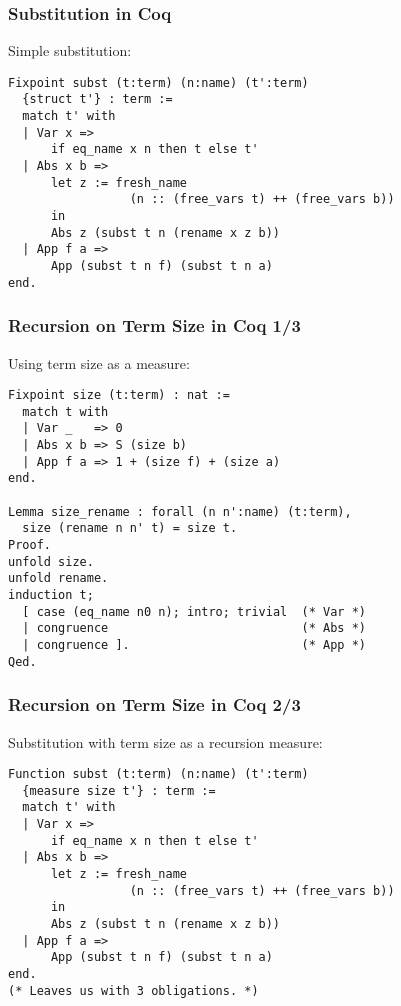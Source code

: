 \documentclass[notheorems]{beamer}
\begin{document}
\begin{frame}[fragile]

  \frametitle{Substitution in Coq}

  Simple substitution:
  \begin{lstlisting}
Fixpoint subst (t:term) (n:name) (t':term)
  {struct t'} : term :=
  match t' with
  | Var x =>
      if eq_name x n then t else t'
  | Abs x b =>
      let z := fresh_name
                 (n :: (free_vars t) ++ (free_vars b))
      in
      Abs z (subst t n (rename x z b))
  | App f a =>
      App (subst t n f) (subst t n a)
end.
  \end{lstlisting}

\end{frame}


\begin{frame}[fragile]

  \frametitle{Recursion on Term Size in Coq 1/3}

  Using term size as a measure:
  \begin{lstlisting}
Fixpoint size (t:term) : nat :=
  match t with
  | Var _   => 0
  | Abs x b => S (size b)
  | App f a => 1 + (size f) + (size a)
end.

Lemma size_rename : forall (n n':name) (t:term),
  size (rename n n' t) = size t.
Proof.
unfold size.
unfold rename.
induction t;
  [ case (eq_name n0 n); intro; trivial  (* Var *)
  | congruence                           (* Abs *)
  | congruence ].                        (* App *)
Qed.
  \end{lstlisting}

\end{frame}


\begin{frame}[fragile]

  \frametitle{Recursion on Term Size in Coq 2/3}

  Substitution with term size as a recursion measure:
  \begin{lstlisting}
Function subst (t:term) (n:name) (t':term)
  {measure size t'} : term :=
  match t' with
  | Var x =>
      if eq_name x n then t else t'
  | Abs x b =>
      let z := fresh_name
                 (n :: (free_vars t) ++ (free_vars b))
      in
      Abs z (subst t n (rename x z b))
  | App f a =>
      App (subst t n f) (subst t n a)
end.
(* Leaves us with 3 obligations. *)
  \end{lstlisting}

\end{frame}
\end{document}
